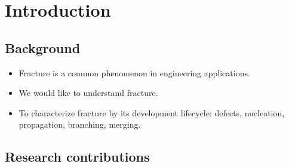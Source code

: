 \section{Introduction}

\sectioncover

\subsection{Background}

\begin{frame}
  \begin{itemize}
    \item Fracture is a common phenomenon in engineering applications.
    \item We would like to understand fracture.
    \item To characterize fracture by its development lifecycle: defects, nucleation, propagation, branching, merging.
  \end{itemize}
\end{frame}

\subsection{Research contributions}

\begin{frame}
\end{frame}
